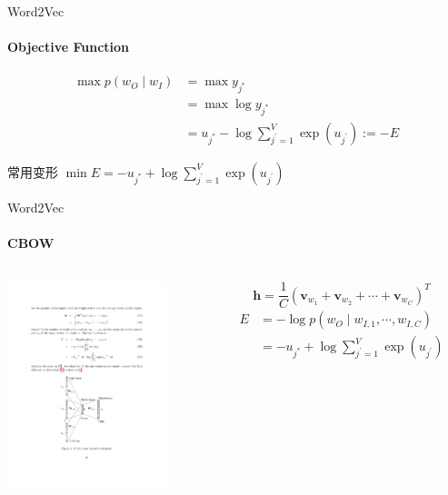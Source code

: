 \documentclass{beamer}
\begin{document}
\begin{frame}{Word2Vec}
    \framesubtitle{Objective Function}
    \begin{equation}
        \begin{aligned}
            \max p\left(w_{O} \mid w_{I}\right) &=\max y_{j^{*}} \\
            &=\max \log y_{j^{*}} \\
            &=u_{j^{*}}-\log \sum_{j^{\prime}=1}^{V} \exp \left(u_{j^{\prime}}\right):=-E
            \end{aligned}
    \end{equation}
    \begin{alertblock}{常用变形}
        $\min E=-u_{j^{*}}+\log \sum_{j^{\prime}=1}^{V} \exp \left(u_{j^{\prime}}\right)$
    \end{alertblock}
\end{frame}
\begin{frame}{Word2Vec}
    \framesubtitle{CBOW}
    \begin{columns}
        \begin{column}{0.4\textwidth}
            \centering\includegraphics[height=6cm]{word2vec_2.pdf}
        \end{column}
        \begin{column}{0.6\textwidth}
            $$\mathbf{h} = \frac{1}{C}(\mathbf{v}_{w_1} + \mathbf{v}_{w_2} + \cdots + \mathbf{v}_{w_C})^T$$
            $$
            \begin{aligned}
                E &=-\log p\left(w_{O} \mid w_{I, 1}, \cdots, w_{I, C}\right) \\
                &=-u_{j^{*}}+\log \sum_{j^{\prime}=1}^{V} \exp \left(u_{j^{\prime}}\right) \\
            \end{aligned}
            $$
        \end{column}
    \end{columns}
\end{frame}
\end{document}
